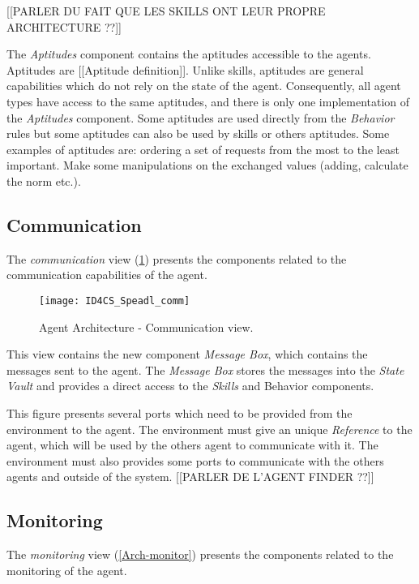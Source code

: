 [[PARLER DU FAIT QUE LES SKILLS ONT LEUR PROPRE ARCHITECTURE ??]]

The \emph{Aptitudes} component contains the aptitudes accessible to the agents. Aptitudes are [[Aptitude definition]]. Unlike skills, aptitudes are general capabilities which do not rely on the state of the agent. Consequently, all agent types have access to the same aptitudes, and there is only one implementation of the \emph{Aptitudes} component.
Some aptitudes are used directly from the \emph{Behavior} rules but some aptitudes can also be used by skills or others aptitudes.
Some examples of aptitudes are: ordering a set of requests from the most to the least important. Make some manipulations on the exchanged values (adding, calculate the norm etc.).

\subsection{Communication}

The \emph{communication} view (\figurename \ref{Arch-comm}) presents the components related to the communication capabilities of the agent. 

\begin{figure}
\centering
\texttt{[image: ID4CS\_Speadl\_comm]}
\caption{Agent Architecture - Communication view.}
\label{Arch-comm}
\end{figure}

This view contains the new component \emph{Message Box}, which contains the messages sent to the agent. The \emph{Message Box} stores the messages into the \emph{State Vault} and provides a direct access to the \emph{Skills} and {Behavior} components.

This figure presents several ports which need to be provided from the environment to the agent. The environment must give an unique \emph{Reference} to the agent, which will be used by the others agent to communicate with it. The environment must also provides some ports to communicate with the others agents and outside of the system.
[[PARLER DE L'AGENT FINDER ??]]

\subsection{Monitoring}

The \emph{monitoring} view (\figurename \ref{Arch-monitor}) presents the components related to the monitoring of the agent. 

